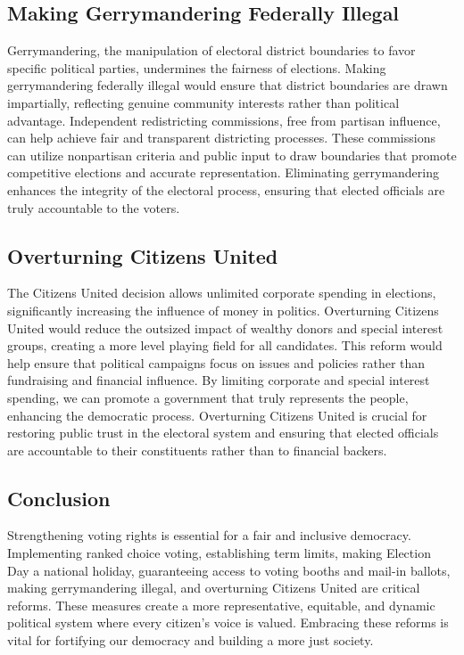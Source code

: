 \subsection{Making Gerrymandering Federally Illegal}\label{subsec:making-gerrymandering-federally-illegal}
Gerrymandering, the manipulation of electoral district boundaries to favor specific political parties, undermines the fairness of elections.
Making gerrymandering federally illegal would ensure that district boundaries are drawn impartially, reflecting genuine community interests rather than political advantage.
Independent redistricting commissions, free from partisan influence, can help achieve fair and transparent districting processes.
These commissions can utilize nonpartisan criteria and public input to draw boundaries that promote competitive elections and accurate representation.
Eliminating gerrymandering enhances the integrity of the electoral process, ensuring that elected officials are truly accountable to the voters.

\subsection{Overturning Citizens United}\label{subsec:overturning-citizens-united}
The Citizens United decision allows unlimited corporate spending in elections, significantly increasing the influence of money in politics.
Overturning Citizens United would reduce the outsized impact of wealthy donors and special interest groups, creating a more level playing field for all candidates.
This reform would help ensure that political campaigns focus on issues and policies rather than fundraising and financial influence.
By limiting corporate and special interest spending, we can promote a government that truly represents the people, enhancing the democratic process.
Overturning Citizens United is crucial for restoring public trust in the electoral system and ensuring that elected officials are accountable to their constituents rather than to financial backers.

\subsection*{Conclusion}
Strengthening voting rights is essential for a fair and inclusive democracy.
Implementing ranked choice voting, establishing term limits, making Election Day a national holiday, guaranteeing access to voting booths and mail-in ballots, making gerrymandering illegal, and overturning Citizens United are critical reforms.
These measures create a more representative, equitable, and dynamic political system where every citizen's voice is valued.
Embracing these reforms is vital for fortifying our democracy and building a more just society.


